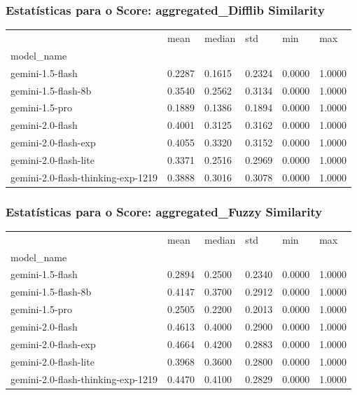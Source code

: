 \documentclass{article}%
\begin{document}
\subsubsection*{Estatísticas para o Score: aggregated\_Difflib Similarity}%
\begin{table}[H]%
\centering%
\begin{tabular}{llllll}
\toprule
 & mean & median & std & min & max \\
model_name &  &  &  &  &  \\
\midrule
gemini-1.5-flash & 0.2287 & 0.1615 & 0.2324 & 0.0000 & 1.0000 \\
gemini-1.5-flash-8b & 0.3540 & 0.2562 & 0.3134 & 0.0000 & 1.0000 \\
gemini-1.5-pro & 0.1889 & 0.1386 & 0.1894 & 0.0000 & 1.0000 \\
gemini-2.0-flash & 0.4001 & 0.3125 & 0.3162 & 0.0000 & 1.0000 \\
gemini-2.0-flash-exp & 0.4055 & 0.3320 & 0.3152 & 0.0000 & 1.0000 \\
gemini-2.0-flash-lite & 0.3371 & 0.2516 & 0.2969 & 0.0000 & 1.0000 \\
gemini-2.0-flash-thinking-exp-1219 & 0.3888 & 0.3016 & 0.3078 & 0.0000 & 1.0000 \\
\bottomrule
\end{tabular}
%
\end{table}%
\vspace{0.5cm}%
\subsubsection*{Estatísticas para o Score: aggregated\_Fuzzy Similarity}%
\begin{table}[H]%
\centering%
\begin{tabular}{llllll}
\toprule
 & mean & median & std & min & max \\
model_name &  &  &  &  &  \\
\midrule
gemini-1.5-flash & 0.2894 & 0.2500 & 0.2340 & 0.0000 & 1.0000 \\
gemini-1.5-flash-8b & 0.4147 & 0.3700 & 0.2912 & 0.0000 & 1.0000 \\
gemini-1.5-pro & 0.2505 & 0.2200 & 0.2013 & 0.0000 & 1.0000 \\
gemini-2.0-flash & 0.4613 & 0.4000 & 0.2900 & 0.0000 & 1.0000 \\
gemini-2.0-flash-exp & 0.4664 & 0.4200 & 0.2883 & 0.0000 & 1.0000 \\
gemini-2.0-flash-lite & 0.3968 & 0.3600 & 0.2800 & 0.0000 & 1.0000 \\
gemini-2.0-flash-thinking-exp-1219 & 0.4470 & 0.4100 & 0.2829 & 0.0000 & 1.0000 \\
\bottomrule
\end{tabular}
%
\end{table}%
\vspace{0.5cm}%
\end{document}
